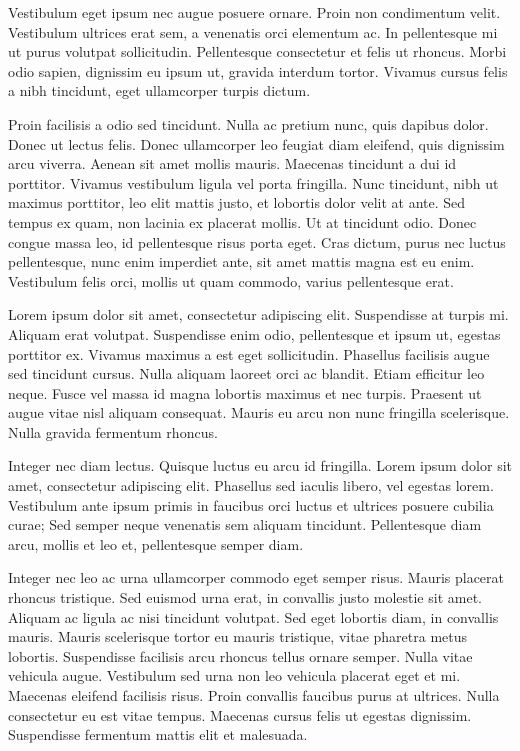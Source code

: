 \documentclass[a4paper,12pt]{article}
\begin{document}
	
	
	
	
	
	
	Vestibulum eget ipsum nec augue posuere ornare. Proin non condimentum velit. Vestibulum ultrices erat sem, a venenatis orci elementum ac. In pellentesque mi ut purus volutpat sollicitudin. Pellentesque consectetur et felis ut rhoncus. Morbi odio sapien, dignissim eu ipsum ut, gravida interdum tortor. Vivamus cursus felis a nibh tincidunt, eget ullamcorper turpis dictum.
	
	Proin facilisis a odio sed tincidunt. Nulla ac pretium nunc, quis dapibus dolor. Donec ut lectus felis. Donec ullamcorper leo feugiat diam eleifend, quis dignissim arcu viverra. Aenean sit amet mollis mauris. Maecenas tincidunt a dui id porttitor. Vivamus vestibulum ligula vel porta fringilla. Nunc tincidunt, nibh ut maximus porttitor, leo elit mattis justo, et lobortis dolor velit at ante. Sed tempus ex quam, non lacinia ex placerat mollis. Ut at tincidunt odio. Donec congue massa leo, id pellentesque risus porta eget. Cras dictum, purus nec luctus pellentesque, nunc enim imperdiet ante, sit amet mattis magna est eu enim. Vestibulum felis orci, mollis ut quam commodo, varius pellentesque erat.
	
	Lorem ipsum dolor sit amet, consectetur adipiscing elit. Suspendisse at turpis mi. Aliquam erat volutpat. Suspendisse enim odio, pellentesque et ipsum ut, egestas porttitor ex. Vivamus maximus a est eget sollicitudin. Phasellus facilisis augue sed tincidunt cursus. Nulla aliquam laoreet orci ac blandit. Etiam efficitur leo neque. Fusce vel massa id magna lobortis maximus et nec turpis. Praesent ut augue vitae nisl aliquam consequat. Mauris eu arcu non nunc fringilla scelerisque. Nulla gravida fermentum rhoncus.
	
	Integer nec diam lectus. Quisque luctus eu arcu id fringilla. Lorem ipsum dolor sit amet, consectetur adipiscing elit. Phasellus sed iaculis libero, vel egestas lorem. Vestibulum ante ipsum primis in faucibus orci luctus et ultrices posuere cubilia curae; Sed semper neque venenatis sem aliquam tincidunt. Pellentesque diam arcu, mollis et leo et, pellentesque semper diam.
	
	Integer nec leo ac urna ullamcorper commodo eget semper risus. Mauris placerat rhoncus tristique. Sed euismod urna erat, in convallis justo molestie sit amet. Aliquam ac ligula ac nisi tincidunt volutpat. Sed eget lobortis diam, in convallis mauris. Mauris scelerisque tortor eu mauris tristique, vitae pharetra metus lobortis. Suspendisse facilisis arcu rhoncus tellus ornare semper. Nulla vitae vehicula augue. Vestibulum sed urna non leo vehicula placerat eget et mi. Maecenas eleifend facilisis risus. Proin convallis faucibus purus at ultrices. Nulla consectetur eu est vitae tempus. Maecenas cursus felis ut egestas dignissim. Suspendisse fermentum mattis elit et malesuada.
	
\end{document}

